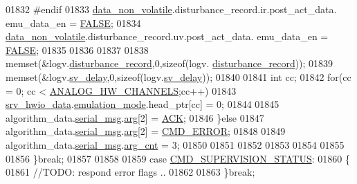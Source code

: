 \begin{DoxyCode}
{{{{{01832 \textcolor{preprocessor}{                          #endif}
01833                           \hyperlink{a00060_a76ac5f917f5308dcd83de0d7c94559fb}{data\_non\_volatile}.disturbance\_record.ir.post\_act\_data.
      emu\_data\_en       = \hyperlink{a00040_aa93f0eb578d23995850d61f7d61c55c1}{FALSE};
01834                           \hyperlink{a00060_a76ac5f917f5308dcd83de0d7c94559fb}{data\_non\_volatile}.disturbance\_record.uv.post\_act\_data.
      emu\_data\_en       = \hyperlink{a00040_aa93f0eb578d23995850d61f7d61c55c1}{FALSE};
01835 
01836                           
01837 
01838                           memset(&logv.\hyperlink{a00021_a11ed024c2cc5c53c79b2c0a8b35e3c06}{disturbance\_record},0,\textcolor{keyword}{sizeof}(logv.
      \hyperlink{a00021_a11ed024c2cc5c53c79b2c0a8b35e3c06}{disturbance\_record}));
01839                           memset(&logv.\hyperlink{a00021_a854b8f967c206a5f3e4aeaf91a782b3e}{sv\_delay},0,\textcolor{keyword}{sizeof}(logv.\hyperlink{a00021_a854b8f967c206a5f3e4aeaf91a782b3e}{sv\_delay}));
01840 
01841                           \textcolor{keywordtype}{int} cc;
01842                           \textcolor{keywordflow}{for}(cc = 0; cc < \hyperlink{a00034_ab6ea71f43c4869429695d697be882efe}{ANALOG\_HW\_CHANNELS};cc++)
01843                           \hyperlink{a00034_a0fd91014631926f362c7c2b2f5d143b0}{srv\_hwio\_data}.\hyperlink{a00034_a742dceaef1f19ec73ed5acc066127476}{emulation\_mode}.head\_ptr[cc] = 0;
01844                           
01845                              algorithm\_data.\hyperlink{a00016_afcf5f557aea688aad985eec15269c1da}{serial\_msg}.\hyperlink{a00031_af7d6f762438c80072bd9dc0e4dd4ae1e}{arg}[2] = \hyperlink{a00021_a6f6489887e08bff4887d0bc5dcf214d8}{ACK};
01846                          \}\textcolor{keywordflow}{else}
01847                              algorithm\_data.\hyperlink{a00016_afcf5f557aea688aad985eec15269c1da}{serial\_msg}.\hyperlink{a00031_af7d6f762438c80072bd9dc0e4dd4ae1e}{arg}[2] = 
      \hyperlink{a00021_a1764a522e9c1a59a59be8757c69fa494}{CMD\_ERROR};
01848 
01849                              algorithm\_data.\hyperlink{a00016_afcf5f557aea688aad985eec15269c1da}{serial\_msg}.\hyperlink{a00031_a7b79f40e2eeec288091afd340bf8f591}{arg\_cnt} = 3;
01850 
01851 
01852 
01853 
01854 
01855 
01856                 \}\textcolor{keywordflow}{break};
01857 
01858 
01859                  \textcolor{keywordflow}{case}  \hyperlink{a00021_ad6af9210ac0903986f3ac3e55c6816a3}{CMD\_SUPERVISION\_STATUS}:
01860                 \{
01861                     \textcolor{comment}{//TODO: respond error flags ..}
01862 
01863                 \}\textcolor{keywordflow}{break};
}}}}}
\end{DoxyCode}
